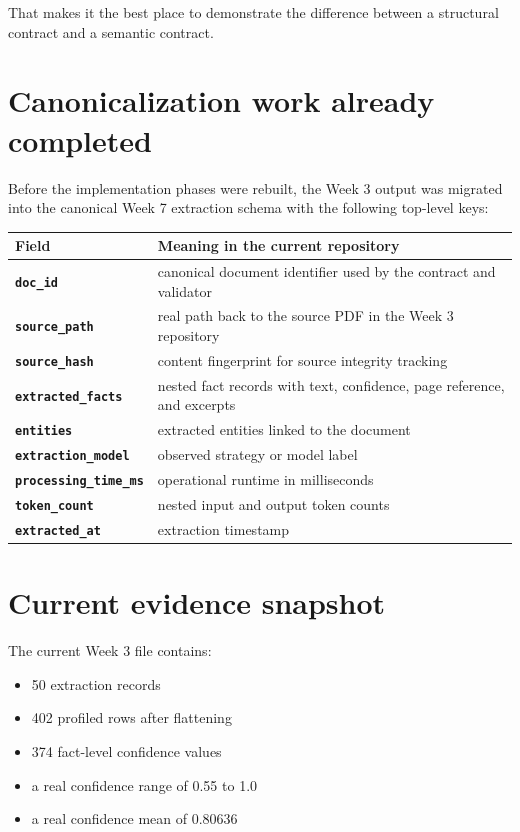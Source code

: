 \documentclass[11pt]{report}
\begin{document}
That makes it the best place to demonstrate the difference between a structural contract and a semantic contract.

\section{Canonicalization work already completed}
Before the implementation phases were rebuilt, the Week 3 output was migrated into the canonical Week 7 extraction schema with the following top-level keys:

\begin{center}
\begin{tabularx}{\textwidth}{>{\bfseries}p{1.5in} X}
\toprule
Field & Meaning in the current repository \\
\midrule
\texttt{doc\_id} & canonical document identifier used by the contract and validator \\
\texttt{source\_path} & real path back to the source PDF in the Week 3 repository \\
\texttt{source\_hash} & content fingerprint for source integrity tracking \\
\texttt{extracted\_facts} & nested fact records with text, confidence, page reference, and excerpts \\
\texttt{entities} & extracted entities linked to the document \\
\texttt{extraction\_model} & observed strategy or model label \\
\texttt{processing\_time\_ms} & operational runtime in milliseconds \\
\texttt{token\_count} & nested input and output token counts \\
\texttt{extracted\_at} & extraction timestamp \\
\bottomrule
\end{tabularx}
\end{center}

\section{Current evidence snapshot}
The current Week 3 file contains:

\begin{itemize}[leftmargin=1.5em]
  \item 50 extraction records
  \item 402 profiled rows after flattening
  \item 374 fact-level confidence values
  \item a real confidence range of 0.55 to 1.0
  \item a real confidence mean of 0.80636
\end{itemize}
\end{document}
